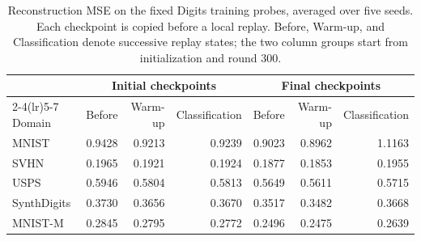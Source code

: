 \begin{table}[t]
\coauthorcolor
\centering
\small
\setlength{\tabcolsep}{8pt}
\caption{Reconstruction MSE on the fixed Digits training probes, averaged over five seeds. Each checkpoint is copied before a local replay. Before, Warm-up, and Classification denote successive replay states; the two column groups start from initialization and round 300.}
\label{tab:digits_reconstruction}
\begin{tabular}{lrrrrrr}
\toprule
& \multicolumn{3}{c}{Initial checkpoints} & \multicolumn{3}{c}{Final checkpoints} \\
\cmidrule(lr){2-4}\cmidrule(lr){5-7}
Domain & Before & Warm-up & Classification & Before & Warm-up & Classification \\
\midrule
MNIST & 0.9428 & 0.9213 & 0.9239 & 0.9023 & 0.8962 & 1.1163 \\
SVHN & 0.1965 & 0.1921 & 0.1924 & 0.1877 & 0.1853 & 0.1955 \\
USPS & 0.5946 & 0.5804 & 0.5813 & 0.5649 & 0.5611 & 0.5715 \\
SynthDigits & 0.3730 & 0.3656 & 0.3670 & 0.3517 & 0.3482 & 0.3668 \\
MNIST-M & 0.2845 & 0.2795 & 0.2772 & 0.2496 & 0.2475 & 0.2639 \\
\bottomrule
\end{tabular}
\end{table}
